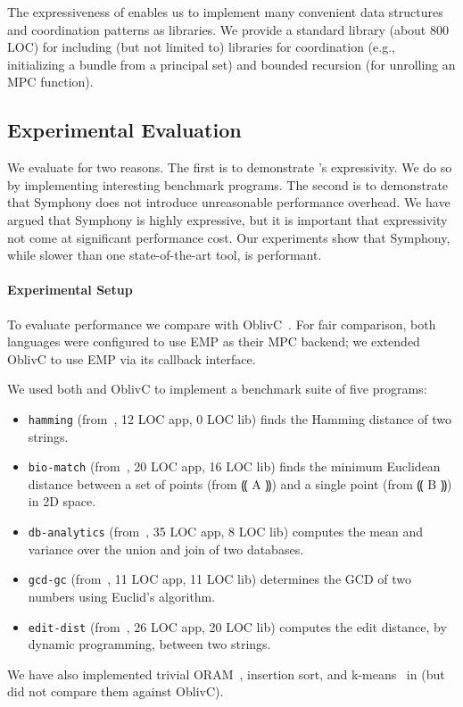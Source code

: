 The expressiveness of \system{} enables us to implement many convenient data structures
and coordination patterns as libraries. We provide a standard library (about 800 LOC) for \system{}
including (but not limited to) libraries for coordination (e.g., initializing a bundle from a principal
set) and bounded recursion (for unrolling an MPC function).

\subsection{Experimental Evaluation}
\label{subsec:mpc-impl-eval}

We evaluate \system for two reasons.
The first is to demonstrate \system's expressivity.
We do so by implementing interesting benchmark programs.
The second is to demonstrate that Symphony does not introduce unreasonable performance overhead.
We have argued that Symphony is highly expressive, but it is
important that expressivity not come at significant performance cost.
Our experiments show that Symphony, while slower than one state-of-the-art tool,
is performant.

\paragraph{Experimental Setup}

To evaluate performance we compare \system with
OblivC~\cite{cryptoeprint:2015:1153}.
For fair comparison, both languages were configured to use EMP as their
MPC backend; we extended OblivC to use EMP via its
callback interface.

We used both \system and OblivC to implement a benchmark suite of five
programs:
\begin{itemize}
  \item \texttt{hamming} (from~\cite{10.1007/978-3-642-54807-9_15, CCS:ZhaSteBla13}, 12 LOC app, 0 LOC lib) finds the Hamming distance of two strings.
  \item \texttt{bio-match} (from~\cite{CCS:BDKKS18}, 20
LOC app, 16 LOC lib) finds the minimum Euclidean distance between a set of points
(from ⸨ A ⸩) and a single point (from ⸨ B ⸩) in 2D space.
  \item \texttt{db-analytics} (from~\cite{CCS:BDKKS18}, 35 LOC app, 8 LOC lib) computes the mean
    and variance over the union and join of two databases.
  \item \texttt{gcd-gc} (from~\cite{10.1145/3319535.3339818}, 11 LOC app, 11 LOC lib) determines the GCD of two numbers using Euclid's algorithm.
  \item \texttt{edit-dist} (from~\cite{cryptoeprint:2015:1153}, 26 LOC app, 20 LOC lib) computes the edit distance, by dynamic
    programming, between two strings.
\end{itemize}
We have also implemented trivial ORAM~\cite{10.1145/2810103.2813634}, insertion sort, and k-means~\cite{CCS:BDKKS18} in \system (but did not compare them against OblivC).


